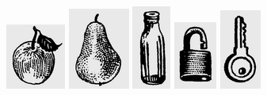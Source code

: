 \documentclass[a5paper]{article}
\begin{document}
 \includegraphics[width=0.7709in,height=0.8437in]{images/MuhammadBagauddinprettified-img315.png}   \includegraphics[width=0.7917in,height=1.052in]{images/MuhammadBagauddinprettified-img316.png}   \includegraphics[width=0.5in,height=1.0835in]{images/MuhammadBagauddinprettified-img317.png}   \includegraphics[width=0.552in,height=0.8752in]{images/MuhammadBagauddinprettified-img318.png}   \includegraphics[width=0.5311in,height=1.0311in]{images/MuhammadBagauddinprettified-img319.png} 
\end{document}
